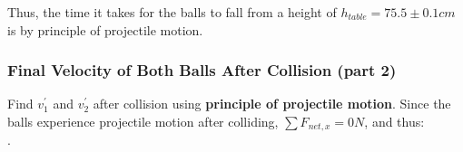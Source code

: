 \documentclass[12pt]{article}
\begin{document}
Thus, the time it takes for the balls to fall from a height of $h_{table} = 75.5\pm0.1cm$ is  by principle of projectile motion.

\pagebreak

\subsubsection{Final Velocity of Both Balls After Collision (part 2)}
Find $v_{1}^{'}$ and $v_{2}^{'}$ after collision using \textbf{principle of projectile motion}. Since the balls experience projectile motion after colliding, $\sum{F_{net,x}} = 0N$, and thus:\\.
\end{document}
